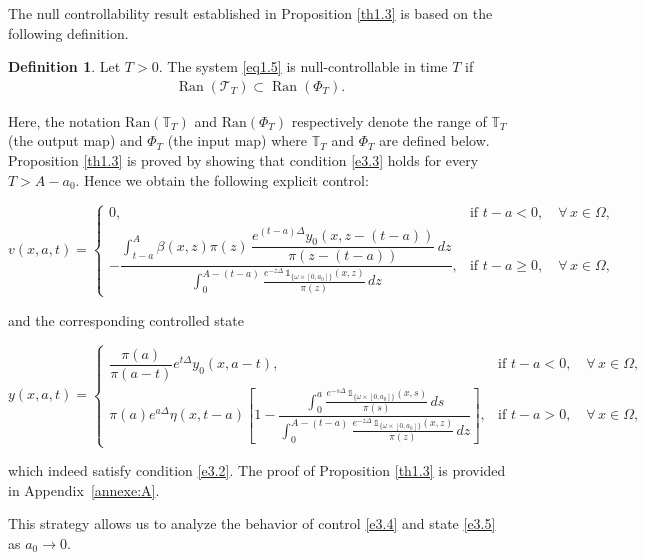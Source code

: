 \documentclass[10pt, a4]{amsart}
\theoremstyle{plain}
\theoremstyle{definition}
\newtheorem{definition}[lemma]{Definition}
\theoremstyle{remark}
\numberwithin{equation}{section}
\def\to{\rightarrow}
\begin{document}
The null controllability result established in Proposition \ref{th1.3} is based on the following definition. \begin{definition}\cite[Definition 11.1.1, p. 364]{ref48}\label{d3.2}
    Let $T>0.$ The system \eqref{eq1.5} is null-controllable in time $T$ if
    \begin{align}\label{e3.3}
        \operatorname{Ran} (\mathcal{T}_T) \subset \operatorname{Ran}(\Phi_T).
    \end{align}
\end{definition}
Here, the notation \(\text{Ran}(\mathbb{T}_T)\) and \(\text{Ran}(\Phi_T)\) respectively denote the range of \(\mathbb{T}_T\) (the output map) and \(\Phi_T\) (the input map) where \(\mathbb{T}_T\) and \(\Phi_T\) are defined below.  Proposition \ref{th1.3} is proved by showing that condition \eqref{e3.3} holds for every $T>A-a_0$. Hence we obtain the following explicit control:

\begin{equation}\label{e3.4}
v(x,a,t)=\begin{cases}
0, & \text{if } t-a<0,\quad \forall\, x\in\Omega,\\[1mm]
-\dfrac{\displaystyle\int_{t-a}^{A}\beta(x,z)\pi(z)\,\dfrac{e^{(t-a)\Delta}y_0(x,z-(t-a))}{\pi(z-(t-a))}\,dz}{\displaystyle\int_{0}^{A-(t-a)}\frac{e^{-z\Delta}\,\mathds{1}_{\{\omega\times[0,a_0]\}}(x,z)}{\pi(z)}\,dz}, & \text{if } t-a\geq 0,\quad \forall\, x\in\Omega,
\end{cases}
\end{equation} 

and the corresponding controlled state

\begin{equation}\label{e3.5}
y(x,a,t)=\begin{cases}
\dfrac{\pi(a)}{\pi(a-t)}e^{t\Delta}y_0(x,a-t), & \text{if } t-a<0,\quad \forall\, x\in\Omega,\\[1mm]
\pi(a)e^{a\Delta}\eta(x,t-a)\left[1-\dfrac{\displaystyle\int_{0}^{a}\frac{e^{-s\Delta}\,\mathds{1}_{\{\omega\times[0,a_0]\}}(x,s)}{\pi(s)}\,ds}{\displaystyle\int_{0}^{A-(t-a)}\frac{e^{-z\Delta}\,\mathds{1}_{\{\omega\times[0,a_0]\}}(x,z)}{\pi(z)}\,dz}\right], & \text{if } t-a>0,\quad \forall\, x\in\Omega,
\end{cases}
\end{equation} 

which indeed satisfy condition \eqref{e3.2}.  The proof of Proposition \ref{th1.3} is provided in Appendix~\ref{annexe:A}. 

This strategy allows us to analyze the behavior of control \eqref{e3.4} and state \eqref{e3.5} as $a_0\to 0.$
\end{document}
